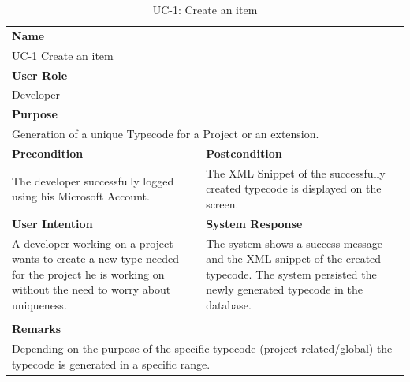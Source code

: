 \begin{table}[H]
    \centering
    \begin{tabular}{|p{}|p{}|}

        \hline
        \multicolumn{2}{|l|}{\rowcolor{gray!50}\textbf{Name}} \\
        \multicolumn{2}{|l|}{UC-1 Create an item} \\ \hline

        \multicolumn{2}{|l|}{\rowcolor{gray!50}\textbf{User Role}} \\
        \multicolumn{2}{|l|}{Developer} \\ \hline

        \multicolumn{2}{|l|}{\rowcolor{gray!50}\textbf{Purpose}} \\
        \multicolumn{2}{|l|}{Generation of  a unique Typecode for a Project or an extension.} \\ \hline

        \rowcolor{gray!50}\textbf{Precondition} & \rowcolor{gray!50}\textbf{Postcondition} \\
        The developer successfully logged using his Microsoft Account.
         &
        The XML Snippet of the successfully created typecode is displayed on the screen. \\ \hline

        \rowcolor{gray!50}\textbf{User Intention} & \rowcolor{gray!50}\textbf{System Response} \\
        A developer working on a project wants to create a new type needed for the project he is working on without
        the need to worry about uniqueness.
         &
        The system shows a success message and the XML snippet of the created typecode.
        The system persisted the newly generated typecode in the database.
        \\ \hline

         & \\ \hline

        \multicolumn{2}{|l|}{\rowcolor{gray!50}\textbf{Remarks}} \\
        \multicolumn{2}{|p{1\textwidth}|}{Depending on the purpose of the specific typecode (project related/global) the typecode is generated in a specific range.} \\ \hline
    \end{tabular}
    \caption{UC-1: Create an item}
    \label{tab:uc-1_create-an-item}
\end{table}

